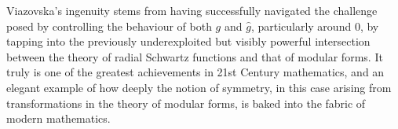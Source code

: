 Viazovska's ingenuity stems from having successfully navigated the challenge posed by controlling the behaviour of both $g$ and $\hat{g}$, particularly around $0$, by tapping into the previously underexploited but visibly powerful intersection between the theory of radial Schwartz functions and that of modular forms. It truly is one of the greatest achievements in 21st Century mathematics, and an elegant example of how deeply the notion of symmetry, in this case arising from transformations in the theory of modular forms, is baked into the fabric of modern mathematics.